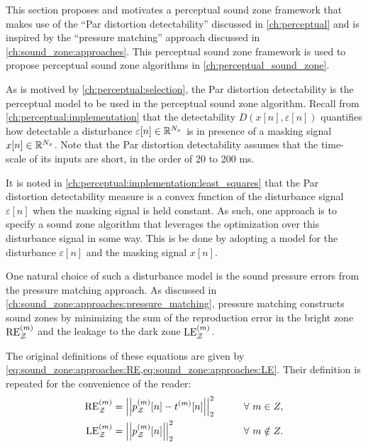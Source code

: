 This section proposes and motivates a perceptual sound zone framework that makes use of the 
``Par distortion detectability'' discussed in \autoref{ch:perceptual} 
and is inspired by the ``pressure matching'' approach discussed in \autoref{ch:sound_zone:approaches}.
This perceptual sound zone framework is used to propose perceptual sound zone algorithms in 
\autoref{ch:perceptual_sound_zone}.

As is motived by \autoref{ch:perceptual:selection}, the Par distortion detectability is the 
perceptual model to be used in the perceptual sound zone algorithm.
Recall from \autoref{ch:perceptual:implementation} that the detectability 
$D(x[n],\varepsilon[n])$ quantifies how detectable a disturbance $\varepsilon[n]\in\mathbb{R}^{N_x}$ 
is in presence of a masking signal $x[n]\in\mathbb{R}^{N_x}$.
Note that the Par distortion detectability assumes that the time-scale of its inputs are short, 
in the order of 20 to 200 ms.

It is noted in \autoref{ch:perceptual:implementation:least_squares} that the Par distortion detectability measure is a convex function of the disturbance signal $\varepsilon[n]$ when the masking signal is held constant. 
As such, one approach is to specify a sound zone algorithm that leverages the optimization over this disturbance signal in some way.
This is be done by adopting a model for the disturbance $\varepsilon[n]$ and the masking signal $x[n]$.

One natural choice of such a disturbance model is the sound pressure errors from the pressure matching approach.
As discussed in \autoref{ch:sound_zone:approaches:pressure_matching}, pressure matching constructs sound zones by minimizing the sum of the reproduction error in the bright zone $\text{RE}^{(m)}_{\mathcal{Z}}$ 
 and the leakage to the dark zone $\text{LE}^{(m)}_{\mathcal{Z}}$.

The original definitions of these equations are given by \autoref{eq:sound_zone:approaches:RE,eq:sound_zone:approaches:LE}.
Their definition is repeated for the convenience of the reader: 
\begin{alignat}{2}
    \text{RE}^{(m)}_\zz &= \norm[2][2]{p_\zz^{(m)}[n] - t^{(m)}[n]} \qquad&& \forall\,\, m\in Z, \\
    \text{LE}^{(m)}_\zz &= \norm[2][2]{p_\zz^{(m)}[n]} \qquad&& \forall\,\, m\notin Z. 
\end{alignat}


